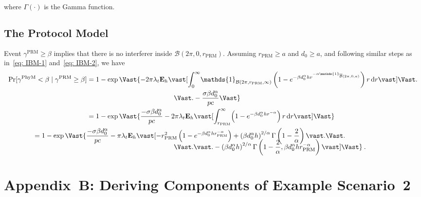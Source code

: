 \documentclass[12pt, draftclsnofoot, onecolumn]{IEEEtran}
\begin{document}
where $\Gamma\left(\cdot \right)$ is the Gamma function.

\subsection{The Protocol Model}
Event $\gamma^{\mathrm{PRM}} \geq \beta$ implies that there is no interferer inside $\mathcal{B}(2\pi,0,r_{\mathrm{PRM}})$. Assuming $r_{\mathrm{PRM}} \geq a$ and $d_0 \geq a$, and following similar steps as in~\eqref{eq: IBM-1} and~\eqref{eq: IBM-2}, we have
\begin{align}\label{eq: PRM-2}
\Pr[\gamma^{\mathrm{PhyM}} < \beta \mid \gamma^{\mathrm{PRM}} \geq \beta]  &= 1 - \exp\Vast\{ -2 \pi  \lambda_t  \mathbf{E}_h \vast[\int_{0}^{\infty} \! \mathds{1}_{\mathcal{B}(2\pi,r_{\mathrm{PRM}},\infty)} \left( 1 - e^{- \beta d_{0}^{\alpha} h r^{-\alpha \mathds{1}_{\overline{\mathcal{B}}(2\pi,0,a)}}} \right) r \, \mathrm{d}r \vast] \Vast. \nonumber \\
& \hspace{45mm} \Vast. - \frac{\sigma \beta d_{0}^{\alpha}}{pc} \Vast\} \nonumber \\
& = 1 - \exp\Vast\{\frac{- \sigma \beta d_{0}^{\alpha}}{pc} -2 \pi  \lambda_t  \mathbf{E}_h \vast[\int_{r_{\mathrm{PRM}}}^{\infty} \! \left( 1 - e^{- \beta d_{0}^{\alpha} h r^{-\alpha}} \right) r \, \mathrm{d}r \vast] \Vast\} \nonumber \\
& \hspace{-28mm} = 1 - \exp\Vast\{ \frac{- \sigma \beta d_{0}^{\alpha}}{pc} - \pi  \lambda_t  \mathbf{E}_h \vast[ - r_{\mathrm{PRM}}^2 \left( 1 - e^{- \beta d_{0}^{\alpha} h r_{\mathrm{PRM}}^{-\alpha}} \right) + \left( \beta d_{0}^{\alpha} h \right)^{2/\alpha} \Gamma\left( 1 - \frac{2}{\alpha} \right) \vast. \Vast. \nonumber \\[-4mm]
& \hspace{45mm} \Vast. \vast.
- \left( \beta d_{0}^{\alpha} h \right)^{2/\alpha} \Gamma\left( 1 - \frac{2}{\alpha}, \beta d_{0}^{\alpha} h r_{\mathrm{PRM}}^{-\alpha} \right) \vast] \Vast\}  \:.
\end{align}

\section*{Appendix~B: Deriving Components of Example Scenario~2}
\setcounter{subsection}{0}
\end{document}
